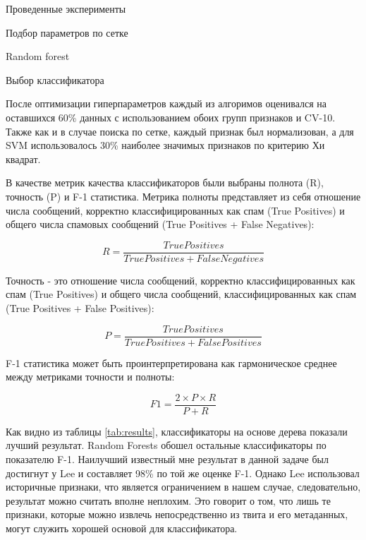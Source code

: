 \begin{section}{Проведенные эксперименты}
\begin{subsection}{Подбор параметров по сетке}
\begin{subsubsection}{Random forest}
\begin{table}[H]
  \caption{Подбор по сетке Random Forest}
  \label{grid:rf}
  \end{table}



\end{subsubsection}

\end{subsection}

\begin{subsection}{Выбор классификатора}

  После оптимизации гиперпараметров каждый из алгоримов оценивался на оставшихся 60\% данных с использованием обоих групп признаков и CV-10. Также как и в случае поиска по сетке, каждый признак был нормализован, а для SVM использовалось 30\% наиболее значимых признаков по критерию Хи квадрат.


В качестве метрик качества классификаторов были выбраны полнота (R), точность (P) и F-1 статистика. Метрика полноты представляет из себя отношение числа сообщений, корректно классифицированных как спам (True Positives) и общего числа спамовых сообщений (True Positives + False Negatives):

\begin{equation}
  R = \frac{True Positives}{True Positives + False Negatives}
\end{equation}

Точность - это отношение числа сообщений, корректно классифицированных как спам (True Positives) и общего числа  сообщений, классифицированных как спам (True Positives + False Positives):

\begin{equation}
  P = \frac{True Positives}{True Positives + False Positives}
\end{equation}

F-1 статистика может быть проинтерпретирована как гармоническое среднее между метриками точности и полноты:

\begin{equation}
  F1 = \frac{2 \times P \times R}{P + R}
\end{equation}

Как видно из таблицы \ref{tab:results}, классификаторы на основе дерева показали лучший результат. Random Forests обошел остальные классификаторы по показателю F-1. Наилучший известный мне результат в данной задаче был достигнут у Lee \cite{Lee} и составляет 98\% по той же оценке F-1. Однако Lee использовал историчные признаки, что является ограничением в нашем случае, следовательно, результат можно считать вполне неплохим. Это говорит о том, что лишь те признаки, которые можно извлечь непосредственно из твита и его метаданных,  могут служить хорошей основой для классификатора.



\end{subsection}
\end{section}
